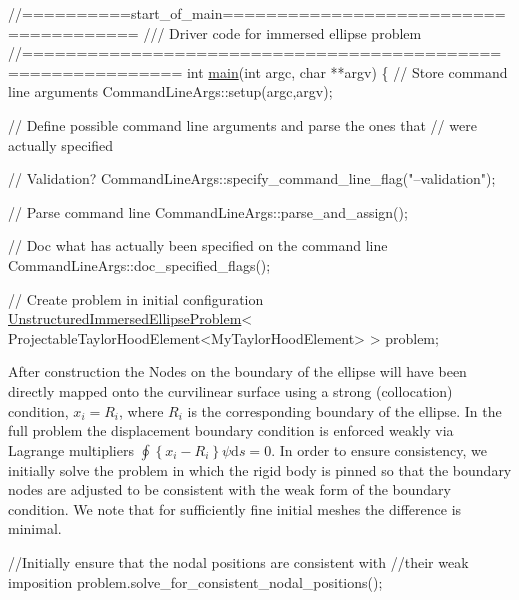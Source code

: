  
\begin{DoxyCodeInclude}
\textcolor{comment}{//==========start\_of\_main======================================}
\textcolor{comment}{/// Driver code for immersed ellipse problem}
\textcolor{comment}{}\textcolor{comment}{//============================================================}
\textcolor{keywordtype}{int} \hyperlink{jeffery__orbit_8cc_a3c04138a5bfe5d72780bb7e82a18e627}{main}(\textcolor{keywordtype}{int} argc, \textcolor{keywordtype}{char} **argv)
\{
 \textcolor{comment}{// Store command line arguments}
 CommandLineArgs::setup(argc,argv);

 \textcolor{comment}{// Define possible command line arguments and parse the ones that}
 \textcolor{comment}{// were actually specified}
 
 \textcolor{comment}{// Validation?}
 CommandLineArgs::specify\_command\_line\_flag(\textcolor{stringliteral}{"--validation"});

 \textcolor{comment}{// Parse command line}
 CommandLineArgs::parse\_and\_assign(); 
 
 \textcolor{comment}{// Doc what has actually been specified on the command line}
 CommandLineArgs::doc\_specified\_flags();
  
 \textcolor{comment}{// Create problem in initial configuration}
 \hyperlink{classUnstructuredImmersedEllipseProblem}{UnstructuredImmersedEllipseProblem}<
 ProjectableTaylorHoodElement<MyTaylorHoodElement> > problem;  

\end{DoxyCodeInclude}


After construction the {\ttfamily Nodes} on the boundary of the ellipse will have been directly mapped onto the curvilinear surface using a strong (collocation) condition, $ x_{i} = R_{i}$, where $R_{i}$ is the corresponding boundary of the ellipse. In the full problem the displacement boundary condition is enforced weakly via Lagrange multipliers $ \oint \left\{x_{i} - R_{i}\right\}\psi \mbox{d} s = 0$. In order to ensure consistency, we initially solve the problem in which the rigid body is pinned so that the boundary nodes are adjusted to be consistent with the weak form of the boundary condition. We note that for sufficiently fine initial meshes the difference is minimal.


\begin{DoxyCodeInclude}

 \textcolor{comment}{//Initially ensure that the nodal positions are consistent with }
 \textcolor{comment}{//their weak imposition}
 problem.solve\_for\_consistent\_nodal\_positions();

\end{DoxyCodeInclude}


